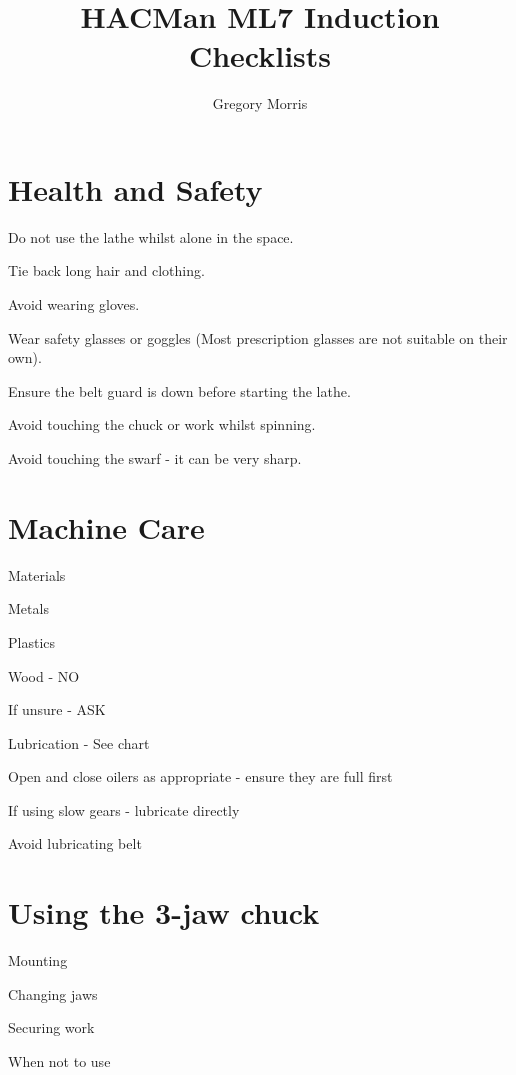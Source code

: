 \documentclass[11pt,a4paper,twoside,openany]{book}
\title{\textbf{HACMan ML7 Induction Checklists}}
\author{Gregory Morris}
\date{}
\newenvironment{checklist}{
  \begin{list}{}{}
  
}{%
  \end{list}
}
\begin{document}
\maketitle
\chapter{Health and Safety}
\begin{checklist}
\item Do not use the lathe whilst alone in the space.
\item Tie back long hair and clothing.
\item Avoid wearing gloves.
\item Wear safety glasses or goggles (Most prescription glasses are not suitable on their own).
\item Ensure the belt guard is down before starting the lathe.
\item Avoid touching the chuck or work whilst spinning.
\item Avoid touching the swarf - it can be very sharp.
\end{checklist}


\chapter{Machine Care}
\begin{checklist}
\item Materials
	\begin{checklist}
	\item Metals
	\item Plastics
	\item Wood - NO
	\item If unsure - ASK
	\end{checklist}
\item Lubrication - See chart
\item Open and close oilers as appropriate - ensure they are full first
\item If using slow gears - lubricate directly
\item Avoid lubricating belt
\end{checklist}



\chapter{Using the 3-jaw chuck}
	\begin{checklist}
	\item Mounting
	\item Changing jaws
	\item Securing work
	\item When not to use
	\end{checklist}
\end{document}
